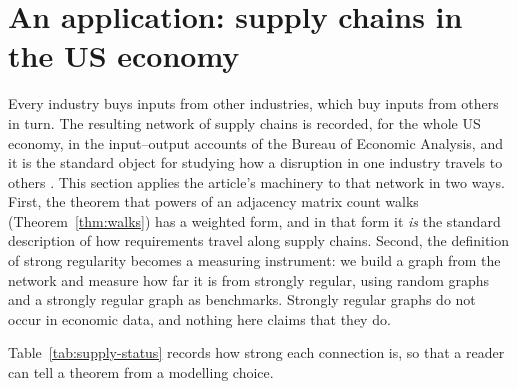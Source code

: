 %
%

\providecommand{\R}{\mathbb{R}}
\providecommand{\tr}{\operatorname{tr}}
\providecommand{\Var}{\operatorname{Var}}
\providecommand{\Bin}{\operatorname{Bin}}
\providecommand{\fro}[1]{\lVert #1\rVert_F}
\providecommand{\1}{\mathbf{1}}

\section{An application: supply chains in the US economy}
\label{sec:supply}

Every industry buys inputs from other industries, which buy inputs from others
in turn. The resulting network of supply chains is recorded, for the whole US
economy, in the input--output accounts of the Bureau of Economic Analysis, and
it is the standard object for studying how a disruption in one industry
travels to others \cite{acemoglu2012,carvalho2014}. This
section applies the article's machinery to that network in two ways. First, the
theorem that powers of an adjacency matrix count walks (Theorem~\ref{thm:walks})
has a weighted form, and in that form it \emph{is} the standard description of
how requirements travel along supply chains. Second, the definition of strong
regularity becomes a measuring instrument: we build a graph from the network and
measure how far it is from strongly regular, using random graphs and a strongly
regular graph as benchmarks. Strongly regular graphs do not occur in economic
data, and nothing here claims that they do.

Table~\ref{tab:supply-status} records how strong each connection is, so that a
reader can tell a theorem from a modelling choice.

